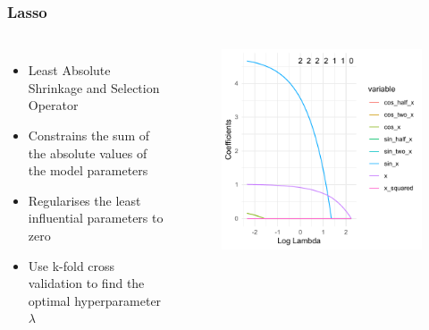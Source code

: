 \documentclass[aspectratio=169]{beamer}
\begin{document}
\begin{frame}
	\frametitle{Lasso}
	\begin{columns}
		\begin{itemize}
			\item Least Absolute Shrinkage and Selection Operator
			\item Constrains the sum of the absolute values of the model parameters
			\item Regularises the least influential parameters to zero
			\item Use k-fold cross validation to find the optimal hyperparameter \(\lambda\)
		\end{itemize}
		\begin{figure}
			\includegraphics[width=\linewidth]{lasso-lambda.pdf}
		\end{figure}
	\end{columns}

\end{frame}
\end{document}
